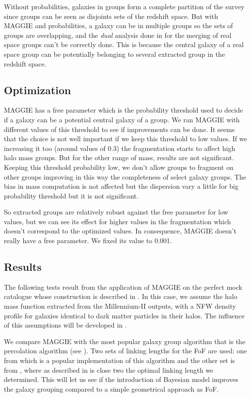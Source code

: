 Without probabilities, galaxies in groups form a complete partition of the
survey since groups can be seen as disjoints sets of the redshift space. But
with MAGGIE and probabilities, a galaxy can be in multiple groups so the
sets of groups are overlapping, and the \emph{dual} analysis done in
\citet{DM+14a} for the merging of real space groups can't be correctly done.
This is because the central galaxy of a real space group can be potentially
belonging to several extracted group in the redshift space.

\subsection{Optimization}

MAGGIE has a free parameter which is the probability threshold used to
decide if a galaxy can be a potential central galaxy of a group. We ran
MAGGIE with different values of this threshold to see if improvements can be
done. It seems that the choice is not well important if we keep this
threshold to low values. If we increasing it too (around values of 0.3) the
fragmentation starts to affect high halo mass groups. But for the other
range of mass, results are not significant. Keeping this threshold probability
low, we don't allow groups to fragment on other groups improving in this way
the completeness of select galaxy groups. The bias in mass computation is
not affected but the dispersion vary a little for big probability threshold
but it is not significant.

So extracted groups are relatively robust against the free parameter for low
values, but we can see its effect for higher values in the fragmentation
which doesn't correspond to the optimized values. In consequence, MAGGIE
doesn't really have a free parameter. We fixed its value to 0.001.

\subsection{Results}

The following tests result from the application of MAGGIE on the perfect mock
catalogue whose construction is described in . In this
case, we assume the halo mass function extracted from the Millennium-II
outputs, with a NFW density profile for galaxies identical to dark matter
particles in their halos. The influence of this assumptions will be developed
in .

We compare MAGGIE with the most popular galaxy group algorithm that is the
percolation algorithm (see ). Two
sets of linking lengths for the FoF are used: one from \citet{Berlind+06} which
is a popular implementation of this algorithm and the other set is from
\citet{Robotham+11}, where as described in
 is close two the optimal linking
length we determined. This will let us see if the introduction of Bayesian
model improves the galaxy grouping compared to a simple geometrical approach as
FoF.

